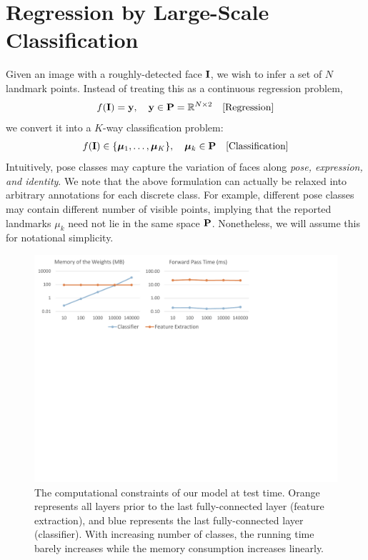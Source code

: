 \documentclass[letterpaper]{article} %
\begin{document}
\section{Regression by Large-Scale Classification}
\setcounter{secnumdepth}{2}

Given an image with a roughly-detected face ${\bf I}$, we wish to infer a set of $N$ landmark points. Instead of treating this as a continuous regression problem,
\begin{align}
    f({\bf I}) = {\bf y}, \quad {\bf y} \in {\bf P} = \mathbb{R}^{N \times 2} \quad \text{[Regression]}
\end{align}
we convert it into a $K$-way classification problem:
\begin{align}
    f({\bf I}) \in \{ {\bm \mu}_1,\ldots, {\bm \mu}_K \}, \quad {\bm \mu}_k \in {\bf P} \quad \text{[Classification]}
\end{align}
Intuitively, pose classes may capture the variation of faces along {\em pose, expression, and identity}. We note that the above formulation can actually be relaxed into arbitrary annotations for each discrete class. For example, different pose classes may contain different number of visible points, implying that the reported landmarks $\mu_k$ need not lie in the same space ${\bf P}$. Nonetheless, we will assume this for notational simplicity.

\label{sec:poseclass}

\begin{figure}[t!]
\begin{center}
   \includegraphics[width=1\linewidth]{fig/Computation2.pdf}
\end{center}
   \caption{The computational constraints of our model at test time. Orange represents all layers prior to the last fully-connected layer (feature extraction), and blue represents the last fully-connected layer (classifier). With increasing number of classes, the running time barely increases while the memory consumption increases linearly.}
\label{fig:computation}
\end{figure}
\end{document}
